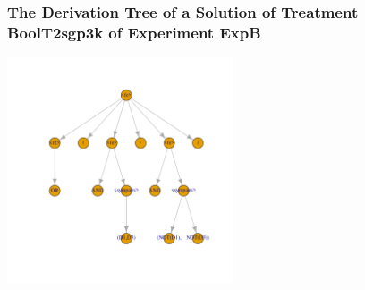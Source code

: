  \begin{frame}
 \frametitle{ The Derivation Tree of a Solution of Treatment BoolT2sgp3k of Experiment ExpB }
 \begin{center}
\includegraphics[width=0.5\textwidth, angle=0]
{ExpBDerivationTreeFigure011.pdf}
 \end{center}
 \label{report/ExpBDerivationTreeFigure011.pdf}  
 \end{frame}

